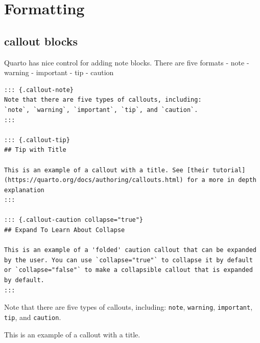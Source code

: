 \documentclass[
  letterpaper,
  DIV=11,
  numbers=noendperiod,
  oneside]{scrartcl}
\begin{document}
\hypertarget{formatting}{%
\section{Formatting}\label{formatting}}

\hypertarget{callout-blocks}{%
\subsection{callout blocks}\label{callout-blocks}}

Quarto has nice control for adding note blocks. There are five formats
 - note - warning - important - tip -
caution

\begin{verbatim}
::: {.callout-note}
Note that there are five types of callouts, including:
`note`, `warning`, `important`, `tip`, and `caution`.
:::

::: {.callout-tip}
## Tip with Title

This is an example of a callout with a title. See [their tutorial](https://quarto.org/docs/authoring/callouts.html) for a more in depth explanation
:::

::: {.callout-caution collapse="true"}
## Expand To Learn About Collapse

This is an example of a 'folded' caution callout that can be expanded by the user. You can use `collapse="true"` to collapse it by default or `collapse="false"` to make a collapsible callout that is expanded by default.
:::
\end{verbatim}

\begin{tcolorbox}[enhanced jigsaw, colframe=quarto-callout-note-color-frame, left=2mm, bottomtitle=1mm, bottomrule=.15mm, coltitle=black, colbacktitle=quarto-callout-note-color!10!white, leftrule=.75mm, toprule=.15mm, colback=white, rightrule=.15mm, toptitle=1mm, opacityback=0, titlerule=0mm, title=\textcolor{quarto-callout-note-color}{\faInfo}\hspace{0.5em}{Note}, breakable, opacitybacktitle=0.6, arc=.35mm]

Note that there are five types of callouts, including: \texttt{note},
\texttt{warning}, \texttt{important}, \texttt{tip}, and
\texttt{caution}.

\end{tcolorbox}

\begin{tcolorbox}[enhanced jigsaw, colframe=quarto-callout-tip-color-frame, left=2mm, bottomtitle=1mm, bottomrule=.15mm, coltitle=black, colbacktitle=quarto-callout-tip-color!10!white, leftrule=.75mm, toprule=.15mm, colback=white, rightrule=.15mm, toptitle=1mm, opacityback=0, titlerule=0mm, title=\textcolor{quarto-callout-tip-color}{\faLightbulb}\hspace{0.5em}{Tip with Title}, breakable, opacitybacktitle=0.6, arc=.35mm]

This is an example of a callout with a title.

\end{tcolorbox}
\end{document}
